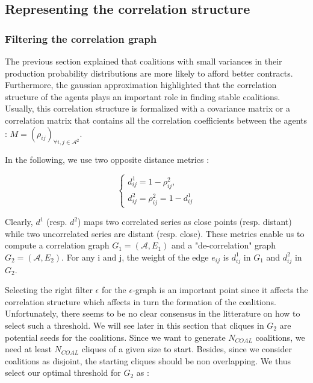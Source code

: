 \documentclass[conference]{IEEEtran}
\begin{document}
\subsection{Representing the correlation structure}

\subsubsection{Filtering the correlation graph}

The previous section explained that coalitions with small variances in their production probability distributions are more likely to afford better contracts. Furthermore, the gaussian approximation highlighted that the correlation structure of the agents plays an important role in finding stable coalitions. Usually, this correlation structure is formalized with a covariance matrix or a correlation matrix that contains all the correlation coefficients between the agents : $ M = (\rho_{ij})_{\forall i,j \in \mathcal{A}^{2}}$.

In the following, we use two opposite distance metrics : 

\begin{equation}
\left\{ \begin{array}{lll}
			d_{ij}^{1} = 1 - \rho_{ij}^{2}, \\
			d_{ij}^{2} = \rho_{ij}^{2} = 1 - d_{ij}^{1}
\end{array} \right.
\end{equation}

Clearly, $ d^{1} $ (resp. $ d^{2} $) maps two correlated series as close points (resp. distant) while two uncorrelated series are distant (resp. close). These metrics enable us to compute a correlation graph $ G_{1} = (\mathcal{A}, E_{1}) $ and a "de-correlation" graph $ G_{2} = (\mathcal{A}, E_{2} ) $. For any i and j, the weight of the edge $ e_{ij} $ is $ d_{ij}^{1} $ in $ G_{1} $ and $ d_{ij}^{2} $ in $ G_{2} $.

Selecting the right filter $ \epsilon $ for the $ \epsilon $-graph is an important point since it affects the correlation structure which affects in turn the formation of the coalitions. Unfortunately, there seems to be no clear consensus in the litterature on how to select such a threshold. We will see later in this section that cliques in $ G_{2} $ are potential seeds for the coalitions. Since we want to generate $ N_{COAL} $ coalitions, we need at least $ N_{COAL} $ cliques of a given size to start. Besides, since we consider coalitions as disjoint, the starting cliques should be non overlapping. We thus select our optimal threshold for $ G_{2} $ as :
\end{document}
